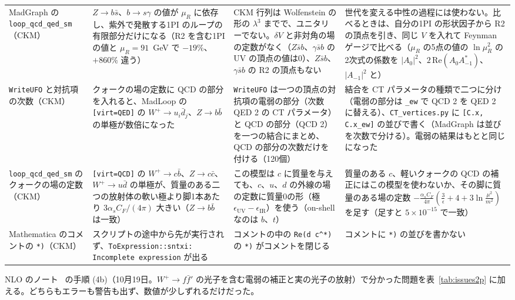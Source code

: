 \documentclass[a4paper,10pt]{ltjsarticle}
\begin{document}
\begin{table}[tbp]
\begin{tabularx}{\linewidth}{>{\raggedright\arraybackslash}p{2.4cm}>{\raggedright\arraybackslash}X>{\raggedright\arraybackslash}X>{\raggedright\arraybackslash}X}
MadGraph の \texttt{loop\_qcd\_qed\_sm}（CKM） & $Z\to b\bar s$、$b\to s\gamma$ の値が $\mu_R$ に依存し、紫外で発散する1PI のループの有限部分だけになる（R2 を含む1PI の値と $\mu_R=91$~GeV で $-19\%$、$+860\%$ 違う） & CKM 行列は Wolfenstein の形の $\lambda^3$ までで、ユニタリーでない。$\delta V$ と非対角の場の定数がなく（$Z\bar sb$、$\gamma\bar sb$ の UV の頂点の値は0）、$Z\bar sb$、$\gamma\bar sb$ の R2 の頂点もない & 世代を変える中性の過程には使わない。比べるときは、自分の1PI の形状因子から R2 の頂点を引き、同じ $V$ を入れて Feynman ゲージで比べる（$\mu_R$ の5点の値の $\ln\mu_R^2$ の2次式の係数を $|A_0|^2$、$2\,\mathrm{Re}(A_0A_{-1}^*)$、$|A_{-1}|^2$ と） \\
\texttt{WriteUFO} と対抗項の次数（CKM） & クォークの場の定数に QCD の部分を入れると、MadLoop の \texttt{[virt=QED]} の $W^+\to u_i\bar d_j$、$Z\to b\bar b$ の単極が数倍になった & \texttt{WriteUFO} は一つの頂点の対抗項の電弱の部分（次数 QED 2 の CT パラメータ）と QCD の部分（QCD 2）を一つの結合にまとめ、QCD の部分の次数だけを付ける（120個） & 結合を CT パラメータの種類で二つに分け（電弱の部分は \texttt{\_ew} で QCD 2 を QED 2 に替える）、\texttt{CT\_vertices.py} に \texttt{[C.x, C.x\_ew]} の並びで書く（MadGraph は並びを次数で分ける）。電弱の結果はもとと同じになった \\
\texttt{loop\_qcd\_qed\_sm} のクォークの場の定数（CKM） & \texttt{[virt=QCD]} の $W^+\to c\bar b$、$Z\to c\bar c$、$W^+\to u\bar d$ の単極が、質量のある二つの放射体の軟い極より脚1本あたり $3\alpha_sC_F/(4\pi)$ 大きい（$Z\to b\bar b$ は一致） & この模型は $c$ に質量を与えても、$c$、$u$、$d$ の外線の場の定数に質量0の形（極 $\epsilon_{\mathrm{UV}}-\epsilon_{\mathrm{IR}}$）を使う（on-shell なのは $b$、$t$） & 質量のある $c$、軽いクォークの QCD の補正にはこの模型を使わないか、その脚に質量のある場の定数 $-\frac{\alpha_sC_F}{4\pi}(\frac3\epsilon+4+3\ln\frac{\mu^2}{m^2})$ を足す（足すと $5\times10^{-15}$ で一致） \\
Mathematica のコメントの \texttt{*)}（CKM） & スクリプトの途中から先が実行されず、\texttt{ToExpression::sntxi: Incomplete expression} が出る & コメントの中の \texttt{Re(d c\^{}*)} の \texttt{*)} がコメントを閉じる & コメントに \texttt{*)} の並びを書かない \\
\bottomrule
\end{tabularx}
\end{table}

NLO のノート~\cite{smnlonote} の手順 (4b)（10月19日。$W^+\to f\bar f'$ の光子を含む電弱の補正と実の光子の放射）で分かった問題を表~\ref{tab:issues2p} に加える。どちらもエラーも警告も出ず、数値が少しずれるだけだった。
\end{document}
